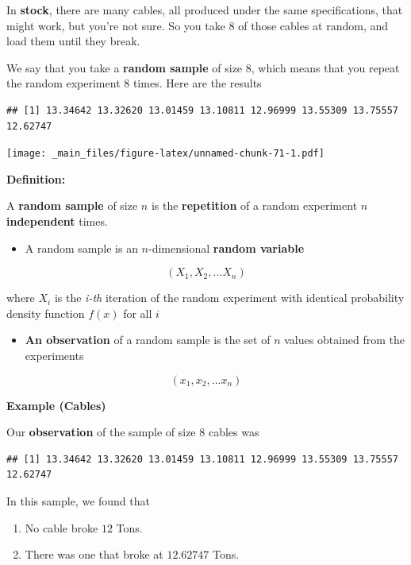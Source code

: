 \documentclass[
]{book}
\providecommand{\tightlist}{%
  \setlength{\itemsep}{0pt}\setlength{\parskip}{0pt}}
\begin{document}
In \textbf{stock}, there are many cables, all produced under the same specifications, that might work, but you're not sure. So you take \(8\) of those cables at random, and load them until they break.

We say that you take a \textbf{random sample} of size \(8\), which means that you repeat the random experiment \(8\) times. Here are the results

\begin{verbatim}
## [1] 13.34642 13.32620 13.01459 13.10811 12.96999 13.55309 13.75557 12.62747
\end{verbatim}

\texttt{[image: \_main\_files/figure-latex/unnamed-chunk-71-1.pdf]}

\textbf{Definition:}

A \textbf{random sample} of size \(n\) is the \textbf{repetition} of a random experiment \(n\) \textbf{independent} times.

\begin{itemize}
\tightlist
\item
  A random sample is an \(n\)-dimensional \textbf{random variable}
\end{itemize}

\[(X_1, X_2, ... X_n)\]

where \(X_i\) is the \emph{i-th} iteration of the random experiment with identical probability density function \(f(x)\) for all \(i\)

\begin{itemize}
\tightlist
\item
  \textbf{An observation} of a random sample is the set of \(n\) values obtained from the experiments
\end{itemize}

\[(x_1, x_2, ... x_n)\]

\textbf{Example (Cables)}

Our \textbf{observation} of the sample of size \(8\) cables was

\begin{verbatim}
## [1] 13.34642 13.32620 13.01459 13.10811 12.96999 13.55309 13.75557 12.62747
\end{verbatim}

In this sample, we found that

\begin{enumerate}
\def\labelenumi{\arabic{enumi})}
\item
  No cable broke \(12\) Tons.
\item
  There was one that broke at \(12.62747\) Tons.
\end{enumerate}
\end{document}
